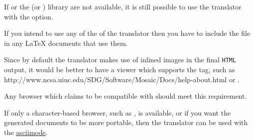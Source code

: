 \noindent
If  or the  (or ) library are not
available, it is still possible to
use the translator with the  option. 

%
%
\html{\\}%

If you intend to use any of the 
of the translator 
then you have to include the  file 
in any \LaTeX{}  documents that use them. 

%
%
%
%
%
%
\html{\\}%

Since by default the translator makes use of inlined images in the final 
\texttt{HTML} output, it would be better to have a viewer 
which supports the  tag, such as %
{http://www.ncsa.uiuc.edu/SDG/Software/Mosaic/Docs/help-about.html}
or .
\begin{changebar}
Any browser which claims to be compatible with \HTMLiii{} should meet
this requirement.
\end{changebar}

%
%
\html{\\}%

If only a character-based browser, such as , is available, 
or if you want the generated documents to be more portable, 
then the translator can be used with the  
\hyperref{option}{option (see Section~}{)}{asciimode}. 




